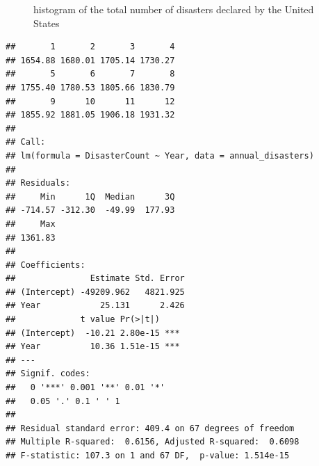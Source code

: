 \documentclass[11pt]{article}\usepackage[]{graphicx}\usepackage[]{xcolor}
\makeatletter
\newenvironment{kframe}{%
 \def\at@end@of@kframe{}%
 \ifinner\ifhmode%
  \def\at@end@of@kframe{\end{minipage}}%
  \begin{minipage}{\columnwidth}%
 \fi\fi%
 \def\FrameCommand##1{\hskip\@totalleftmargin \hskip-\fboxsep
 \colorbox{shadecolor}{##1}\hskip-\fboxsep
     \hskip-\linewidth \hskip-\@totalleftmargin \hskip\columnwidth}%
 \MakeFramed {\advance\hsize-\width
   \@totalleftmargin\z@ \linewidth\hsize
   \@setminipage}}%
 {\par\unskip\endMakeFramed%
 \at@end@of@kframe}
\newenvironment{knitrout}{}{} %
\makeatother
\begin{document}
\begin{figure}[h!]
\begin{minipage}{.8\linewidth}
  \caption{histogram of the total number of disasters declared by the United States} 
  \label{figure:1}
  \end{minipage}
\end{figure}

\clearpage
\begin{knitrout}
\color{fgcolor}\begin{kframe}
\begin{verbatim}
##       1       2       3       4 
## 1654.88 1680.01 1705.14 1730.27 
##       5       6       7       8 
## 1755.40 1780.53 1805.66 1830.79 
##       9      10      11      12 
## 1855.92 1881.05 1906.18 1931.32
## 
## Call:
## lm(formula = DisasterCount ~ Year, data = annual_disasters)
## 
## Residuals:
##     Min      1Q  Median      3Q 
## -714.57 -312.30  -49.99  177.93 
##     Max 
## 1361.83 
## 
## Coefficients:
##               Estimate Std. Error
## (Intercept) -49209.962   4821.925
## Year            25.131      2.426
##             t value Pr(>|t|)    
## (Intercept)  -10.21 2.80e-15 ***
## Year          10.36 1.51e-15 ***
## ---
## Signif. codes:  
##   0 '***' 0.001 '**' 0.01 '*'
##   0.05 '.' 0.1 ' ' 1
## 
## Residual standard error: 409.4 on 67 degrees of freedom
## Multiple R-squared:  0.6156,	Adjusted R-squared:  0.6098 
## F-statistic: 107.3 on 1 and 67 DF,  p-value: 1.514e-15
\end{verbatim}
\end{kframe}
\end{knitrout}
\end{document}
